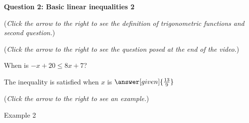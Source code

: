 \documentclass{ximera}
\begin{document}
\textbf{Question 2: Basic linear inequalities 2}
\begin{question}
\begin{flushright}
{\color{blue}(\emph{Click the arrow to the right to see the definition
of trigonometric functions and second question.})}
\end{flushright}
\begin{center}
\begin{expandable}
{\color{blue}(\emph{Click the arrow to the right to see the question
posed at the end of the video.})}
\begin{expandable}
When is $-x+20\leq 8x+7$?\\
\begin{prompt}
The inequality is satisfied when $x$ is  $\answer[given]{\frac{13}{9}}$
\end{prompt}
\begin{flushright}
{\color{blue}(\emph{Click the arrow to the right to see an example.})}
\end{flushright}
\begin{expandable}
Example 2
\end{expandable}
\end{expandable}
\end{expandable}
\end{center}
\end{question}
\end{document}
